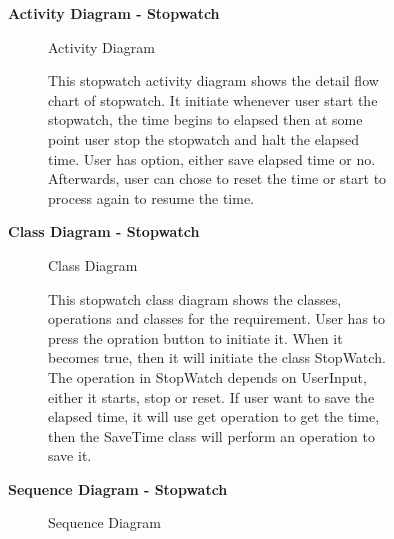 \documentclass{article}
\begin{document}
	\clearpage
	

		\begin{figure}[htbp]
			\textbf{Activity Diagram - Stopwatch }
			\centering
			\begin{subfigure}{\textwidth}
				\resizebox{\textwidth}{!}{}
				\caption{Activity Diagram}
			\end{subfigure}
			\begin{subfigure}{\textwidth}
				This stopwatch activity diagram shows the detail flow chart of stopwatch. It initiate whenever user start the stopwatch, the time begins to elapsed
				then at some point user stop the stopwatch and halt the elapsed time. User has option, either save elapsed time or no. Afterwards, user can 
				chose to reset the time or start to process again to resume the time.
			\end{subfigure}
		\end{figure}
		\clearpage
		

		\begin{figure}[htbp]
			\textbf{Class Diagram - Stopwatch }
			\centering
			\begin{subfigure}{\textwidth}
				\resizebox{\textwidth}{!}{}
				\caption{Class Diagram}
			\end{subfigure}
			\begin{subfigure}{\textwidth}
				This stopwatch class diagram shows the classes, operations and classes for the requirement. User has to press 
				the opration button to initiate it. When it becomes true, then it will initiate the class StopWatch. The operation in StopWatch depends on 
				UserInput, either it starts, stop or reset. If user want to save the elapsed time, it will use get operation to get the time,
				then the SaveTime class will perform an operation to save it. 
			\end{subfigure}
		\end{figure}

		
		\clearpage

		\begin{figure}[htbp]
			\textbf{Sequence Diagram - Stopwatch }
			\centering
			\begin{subfigure}{\textwidth}
				\resizebox{\textwidth}{!}{}
				\caption{Sequence Diagram}
			\end{subfigure}
			\begin{subfigure}{\textwidth}

			\end{subfigure}
		\end{figure}
		\clearpage
\end{document}
